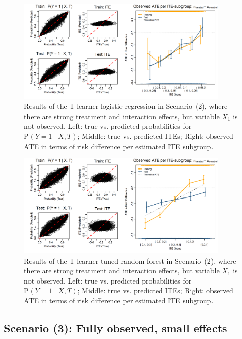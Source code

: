 \begin{figure}[htbp]
\centering
\includegraphics[width=0.9\textwidth]{img/results_ITE_simulation/unobserved_interaction_glm_tlearner.png}
\caption{Results of the T-learner logistic regression in Scenario~(2), where there are strong treatment and interaction effects, but variable $X_1$ is not observed. Left: true vs. predicted probabilities for $\text{P}(Y = 1 \mid X, T)$; Middle: true vs. predicted ITEs; Right: observed ATE in terms of risk difference per estimated ITE subgroup.}
\label{fig:unobserved_interaction_glm_tlearner}
\end{figure}



\begin{figure}[htbp]
\centering
\includegraphics[width=0.9\textwidth]{img/results_ITE_simulation/unobserved_interaction_tuned_rf_tlearner.png}
\caption{Results of the T-learner tuned random forest in Scenario~(2), where there are strong treatment and interaction effects, but variable $X_1$ is not observed. Left: true vs. predicted probabilities for $\text{P}(Y = 1 \mid X, T)$; Middle: true vs. predicted ITEs; Right: observed ATE in terms of risk difference per estimated ITE subgroup.}
\label{fig:unobserved_interaction_tuned_rf_tlearner}
\end{figure}


\clearpage

\subsection{Scenario (3): Fully observed, small effects}

